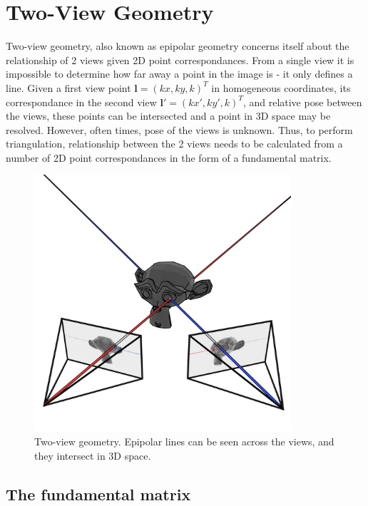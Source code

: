 \documentclass[11pt,english]{report}
\begin{document}
\section{Two-View Geometry}

Two-view geometry, also known as epipolar geometry concerns itself about the relationship of 2 views given 2D point correspondances. From a single view it is impossible to determine how far away a point in the image is - it only defines a line. Given a first view point $\mathbf{l} = (kx, ky, k)^T$ in homogeneous coordinates, its correspondance in the second view $\mathbf{l}' = (kx', ky', k)^T$, and relative pose between the views, these points can be intersected and a point in 3D space may be resolved. However, often times, pose of the views is unknown. Thus, to perform triangulation, relationship between the 2 views needs to be calculated from a number of 2D point correspondances in the form of a fundamental matrix.

\begin{figure}[!ht]
	\centering
	\includegraphics[width=270pt]{docs/report/epipolar-geometry.jpg}
	\caption{\centering Two-view geometry. Epipolar lines can be seen across the views, and they intersect in 3D space.}
\end{figure}

\subsection{The fundamental matrix}
\end{document}

